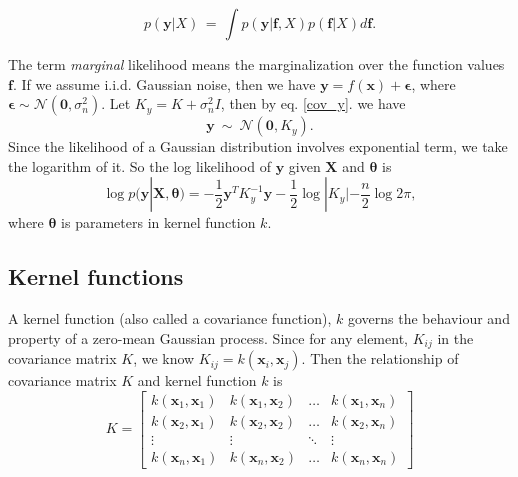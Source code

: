 \documentclass[11pt,a4paper]{article}
\theoremstyle{definition}
\numberwithin{equation}{section}
\let\vec\mathbf
\begin{document}
\begin{equation}
     p(\vec y|X)\, = \, \int p(\vec y|\vec f, X)p(\vec f|X)d\vec f.
\end{equation}

The term \textit{marginal} likelihood means the marginalization over the function values $\vec f$. If we assume i.i.d. Gaussian noise, then we have $\vec y = f(\vec x) + \vec\epsilon$, where $\vec\epsilon \sim \mathcal{N}(\vec 0, \sigma^2_n)$. Let $K_y = K + \sigma^2_nI$, then by eq. \ref{cov_y}. we have
\begin{equation}
\vec y \  \sim \ \mathcal N \left(\vec 0,K_y  \right).
\end{equation}
Since the likelihood of a Gaussian distribution involves exponential term, we take the logarithm of it. So the log likelihood of $\vec y$ given $\vec X$ and $\vec \theta$ is
\begin{equation}\label{log-likelihood}
\log p(\vec y|\vec X, \vec \theta)=-\frac{1}{2}\vec y^T K_y^{-1}\vec y-\frac{1}{2}\log|K_y| - \frac{n}{2}\log 2\pi,
\end{equation}
where $\vec \theta$ is parameters in kernel function $k$.

\subsection{Kernel functions}
A kernel function (also called a covariance function), $k$ governs the behaviour and property of a zero-mean Gaussian process. Since for any element, $K_{ij}$ in the covariance matrix $K$, we know $K_{ij} = k(\vec x_i,\vec x_j)$. Then the relationship of covariance matrix $K$ and kernel function $k$ is
\begin{equation}\label{cov_mat}
K = 
\begin{bmatrix}
k(\vec x_1,\vec x_1) & k(\vec x_1,\vec x_2)& \dots& k(\vec x_1,\vec x_n)\\
k(\vec x_2,\vec x_1) & k(\vec x_2,\vec x_2)& \dots& k(\vec x_2,\vec x_n)\\
\vdots & \vdots  & \ddots & \vdots \\
k(\vec x_n,\vec x_1) & k(\vec x_n,\vec x_2)& \dots& k(\vec x_n,\vec x_n)
\end{bmatrix}
\end{equation}
\end{document}
